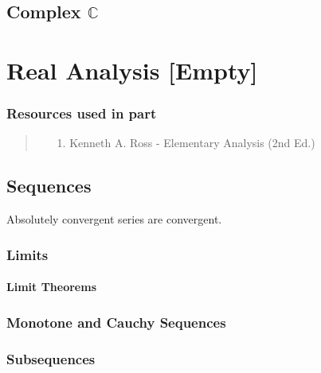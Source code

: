 \documentclass[12pt, english]{book}
\newenvironment{partintro}
{\vspace*{\fill}
	\section*{\centering Resources used in part \thepart}
	\begin{quotation}}
	{\end{quotation}\vspace*{\fill}\newpage}
\begin{document}
	\chapter{Complex \texorpdfstring{\(\mathbb{C}\)}{TEXT}} \label{Complex Chapter - Numbers}
	

	
	\part{Real Analysis [Empty]} \label{Real Analysis Part}
	\begin{partintro}
		\begin{itemize}
			\item[1.] Kenneth A. Ross - Elementary Analysis (2nd Ed.) \cite{Ross.K-Elementary-Analysis-2013}
		\end{itemize}
	\end{partintro}

	\chapter{Sequences} \label{Sequences Chapter - Real Analysis}
	
	\begin{corollary}
		\label{Absolute convergence implies convergence Corollary - Real}
		Absolutely convergent series are convergent.
	\end{corollary}
	
	\section{Limits} \label{Limits Section - Real Analysis}
	
	\subsection{Limit Theorems} \label{Limit Theorems Subsection - Real Analysis}
	
	\section{Monotone and Cauchy Sequences} \label{Monotone and Cauchy Sequences Section - Real Analysis}
	
	\section{Subsequences} \label{Subsequences Section - Real Analysis}
	
\end{document}
